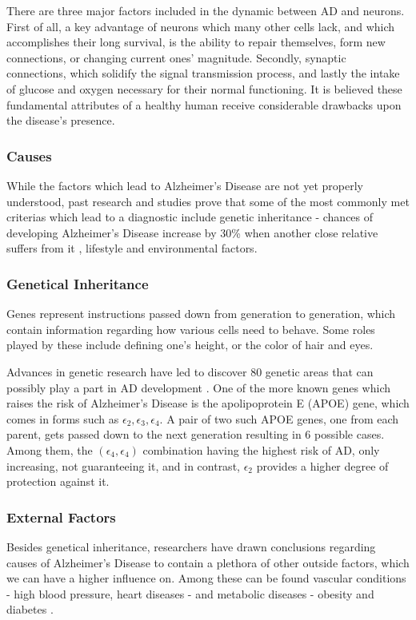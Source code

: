 \documentclass[a4paper, 12pt]{article}
\begin{document}
There are three major factors included in the dynamic between AD and neurons.
First of all, a key advantage of neurons which many other cells lack, and which accomplishes
their long survival, is the ability to repair themselves, form new connections, or changing current ones' magnitude.
Secondly, synaptic connections, which solidify the signal transmission process, and lastly the intake of glucose and
oxygen necessary for their normal functioning.
It is believed these fundamental attributes of a healthy human receive considerable drawbacks upon the disease's presence.
\cite{NIH1}

\subsubsection{Causes} %
While the factors which lead to Alzheimer's Disease are not yet properly understood, past research and studies prove that some
of the most commonly met criterias which lead to a diagnostic include genetic inheritance - chances of developing Alzheimer's
Disease increase by 30\% when another close relative suffers from it \cite{HMS20192801}, lifestyle and environmental factors.

\subsubsection*{Genetical Inheritance} %
Genes represent instructions passed down from generation to generation, which contain information regarding how various cells
need to behave. Some roles played by these include defining one's height, or the color of hair and eyes.

Advances in genetic research have led to discover 80 genetic areas that can possibly play a part in AD development \cite{NIH2}.
One of the more known genes which raises the risk of Alzheimer's Disease is the apolipoprotein E (APOE) gene, which comes in forms such as
$\epsilon_2, \epsilon_3, \epsilon_4$. A pair of two such APOE genes, one from each parent, gets passed down to the next generation
resulting in 6 possible cases. Among them, the $\left(\epsilon_4,\epsilon_4\right)$ combination having the highest risk of AD,
only increasing, not guaranteeing it, and in contrast, $\epsilon_2$ provides a higher degree of protection against it.

\subsubsection*{External Factors} %
Besides genetical inheritance, researchers have drawn conclusions regarding causes of Alzheimer's Disease to contain a plethora
of other outside factors, which we can have a higher influence on.
Among these can be found vascular conditions - high blood pressure, heart diseases - and metabolic diseases - obesity and diabetes
\cite{NIH2}.
\end{document}
